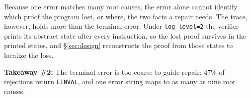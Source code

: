 

Because one error matches many root causes, the error alone cannot identify which proof the program lost, or where, the two facts a repair needs.
The trace, however, holds more than the terminal error.
Under \texttt{log\_level=2} the verifier prints its abstract state after every instruction, so the lost proof survives in the printed states, and \S\ref{sec:design} reconstructs the proof from those states to localize the loss.


\begin{tcolorbox}[colback=blue!5!white,colframe=gray!75!black,left=1mm, right=1mm, top=0.5mm, bottom=0.5mm, arc=1mm]
\textbf{Takeaway \#2:} The terminal error is too coarse to guide repair: 47\% of rejections return \texttt{EINVAL}, and one error string maps to as many as nine root causes.
\end{tcolorbox}

